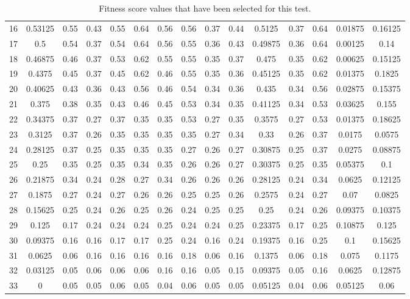 \begin{table}[H]
{{\begin{tabular}{l||c|c|c|c|c|c|c|c|c||c|c|c||c|c}
 	 16 & 0.53125 & 0.55 & 0.43 & 0.55 & 0.64 & 0.56 & 0.56 & 0.37 & 0.44  &  0.5125 & 0.37 & 0.64  &  0.01875 & 0.16125\\
 	 17 & 0.5 & 0.54 & 0.37 & 0.54 & 0.64 & 0.56 & 0.55 & 0.36 & 0.43  &  0.49875 & 0.36 & 0.64  &  0.00125 & 0.14\\
 	 18 & 0.46875 & 0.46 & 0.37 & 0.53 & 0.62 & 0.55 & 0.55 & 0.35 & 0.37  &  0.475 & 0.35 & 0.62  &  0.00625 & 0.15125\\
 	 19 & 0.4375 & 0.45 & 0.37 & 0.45 & 0.62 & 0.46 & 0.55 & 0.35 & 0.36  &  0.45125 & 0.35 & 0.62  &  0.01375 & 0.1825\\
 	 20 & 0.40625 & 0.43 & 0.36 & 0.43 & 0.56 & 0.46 & 0.54 & 0.34 & 0.36  &  0.435 & 0.34 & 0.56  &  0.02875 & 0.15375\\
 	 21 & 0.375 & 0.38 & 0.35 & 0.43 & 0.46 & 0.45 & 0.53 & 0.34 & 0.35  &  0.41125 & 0.34 & 0.53  &  0.03625 & 0.155\\
 	 22 & 0.34375 & 0.37 & 0.27 & 0.37 & 0.35 & 0.35 & 0.53 & 0.27 & 0.35  &  0.3575 & 0.27 & 0.53  &  0.01375 & 0.18625\\
 	 23 & 0.3125 & 0.37 & 0.26 & 0.35 & 0.35 & 0.35 & 0.35 & 0.27 & 0.34  &  0.33 & 0.26 & 0.37  &  0.0175 & 0.0575\\
 	 24 & 0.28125 & 0.37 & 0.25 & 0.35 & 0.35 & 0.35 & 0.27 & 0.26 & 0.27  &  0.30875 & 0.25 & 0.37  &  0.0275 & 0.08875\\
 	 25 & 0.25 & 0.35 & 0.25 & 0.35 & 0.34 & 0.35 & 0.26 & 0.26 & 0.27  &  0.30375 & 0.25 & 0.35  &  0.05375 & 0.1\\
 	 26 & 0.21875 & 0.34 & 0.24 & 0.28 & 0.27 & 0.34 & 0.26 & 0.26 & 0.26  &  0.28125 & 0.24 & 0.34  &  0.0625 & 0.12125\\
 	 27 & 0.1875 & 0.27 & 0.24 & 0.27 & 0.26 & 0.26 & 0.25 & 0.25 & 0.26  &  0.2575 & 0.24 & 0.27  &  0.07 & 0.0825\\
 	 28 & 0.15625 & 0.25 & 0.24 & 0.26 & 0.25 & 0.26 & 0.24 & 0.25 & 0.25  &  0.25 & 0.24 & 0.26  &  0.09375 & 0.10375\\
 	 29 & 0.125 & 0.17 & 0.24 & 0.24 & 0.24 & 0.25 & 0.24 & 0.24 & 0.25  &  0.23375 & 0.17 & 0.25  &  0.10875 & 0.125\\
 	 30 & 0.09375 & 0.16 & 0.16 & 0.17 & 0.17 & 0.25 & 0.24 & 0.16 & 0.24  &  0.19375 & 0.16 & 0.25  &  0.1 & 0.15625\\
 	 31 & 0.0625 & 0.06 & 0.16 & 0.16 & 0.16 & 0.16 & 0.18 & 0.06 & 0.16  &  0.1375 & 0.06 & 0.18  &  0.075 & 0.1175\\
 	 32 & 0.03125 & 0.05 & 0.06 & 0.06 & 0.06 & 0.16 & 0.16 & 0.05 & 0.15  &  0.09375 & 0.05 & 0.16  &  0.0625 & 0.12875\\
 	 33 & 0 & 0.05 & 0.05 & 0.06 & 0.05 & 0.04 & 0.06 & 0.05 & 0.05  &  0.05125 & 0.04 & 0.06  &  0.05125 & 0.06\\
  \end{tabular}
}}
\caption[Fitness Score Test Distribution (Raw)]{Fitness score values that have been selected for this test.}
\label{alldatatable}
\end{table}

